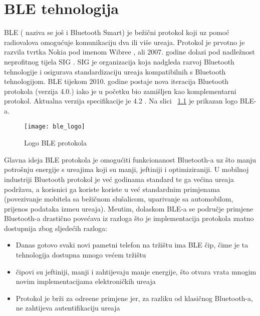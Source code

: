 
\chapter{BLE tehnologija}
BLE ( naziva se jo\v{s} i Bluetooth Smart) je be\v{z}i\v{c}ni protokol koji uz pomo\'{c} radiovalova omogu\'{c}uje komunikaciju dva ili vi\v{s}e ure\dj aja. Protokol je prvotno je razvila tvrtka Nokia pod imenom Wibree \cite{wibree}, ali 2007. godine dolazi pod nadle\v{z}nost neprofitnog tijela SIG \cite{sig}. SIG je organizacija koja nadgleda razvoj Bluetooth tehnologije i osigurava standardizaciju ure\dj aja kompatibilnih s Bluetooth tehnologijom. BLE tijekom 2010. godine postaje nova iteracija Bluetooth protokola (verzija 4.0.) iako je u po\v{c}etku bio zami\v{s}ljen kao komplementarni protokol. Aktualna verzija specifikacije je 4.2 \cite{ble_specification}. Na slici ~\ref{fig:ble} je prikazan logo BLE-a.

\begin{figure}[!htbp]
	\begin{center}
 \texttt{[image: ble\_logo]}
 \caption{Logo BLE protokola}
 \label{fig:ble}
	\end{center}
\end{figure}

Glavna ideja BLE protokola je omogu\'{c}iti funkcionanost Bluetooth-a uz \v{s}to manju potro\v{s}nju energije s ure\dj ajima koji su manji, jeftiniji i optimiziraniji. U mobilnoj industriji Bluetooth protokol je ve\'{c} godinama standard te ga ve\'{c}ina ure\dj aja podr\v{z}ava, a korisnici ga koriste koriste u ve\'{c} standardnim primjenama (povezivanje mobitela sa be\v{z}i\v{c}nom slu\v{s}alicom, uparivanje sa automobilom, prijenos podataka izme\dj u ure\dj aja). Me\dj utim, dolaskom BLE-a se podru\v{c}je primjene Bluetooth-a drasti\v{c}no pove\'{c}ava iz razloga \v{s}to je implementacija protokola znatno dostupnija zbog sljede\'{c}ih razloga:

\begin{itemize}
	\item Danas gotovo svaki novi pametni telefon na tr\v{z}i\v{s}tu ima BLE \v{c}ip, \v{c}ime je ta tehnologija dostupna mnogo ve\'{c}em tr\v{z}i\v{s}tu
	\item \v{c}ipovi su jeftiniji, manji i zahtijevaju manje energije, \v{s}to otvara vrata mnogim novim implementacijama elektroni\v{c}kih ure\dj aja
	\item Protokol je br\v{z}i za odre\dj ene primjene jer, za razliku od klasi\v{c}nog Bluetooth-a, ne zahtijeva autentifikaciju ure\dj aja
\end{itemize}


